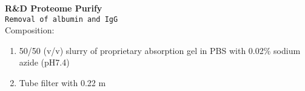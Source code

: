 \textbf{R&D Proteome Purify} 
\\
\texttt{Removal of albumin and IgG}
\\
Composition: 
\begin{enumerate}
\item{50/50 (v/v) slurry of proprietary absorption gel in PBS with 0.02\% sodium azide (pH7.4)}
\item{Tube filter with 0.22 \mu m}
\end{enumerate}

